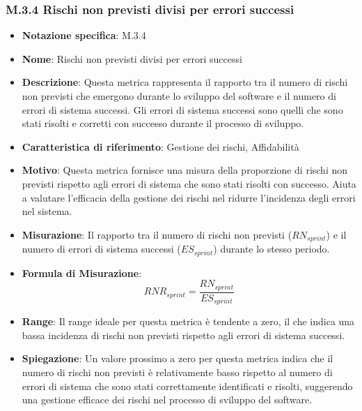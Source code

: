 \subsubsection{M.3.4 Rischi non previsti divisi per errori successi}
\begin{itemize}
    \item \textbf{Notazione specifica}: M.3.4
    \item \textbf{Nome}: Rischi non previsti divisi per errori successi
    \item \textbf{Descrizione}: Questa metrica rappresenta il rapporto tra il numero di rischi non previsti che emergono durante lo sviluppo del software e il numero di errori di sistema successi. Gli errori di sistema successi sono quelli che sono stati risolti e corretti con successo durante il processo di sviluppo.
    \item \textbf{Caratteristica di riferimento}: Gestione dei rischi, Affidabilità
    \item \textbf{Motivo}: Questa metrica fornisce una misura della proporzione di rischi non previsti rispetto agli errori di sistema che sono stati risolti con successo. Aiuta a valutare l'efficacia della gestione dei rischi nel ridurre l'incidenza degli errori nel sistema.
    \item \textbf{Misurazione}: Il rapporto tra il numero di rischi non previsti (\( RN_{sprint} \)) e il numero di errori di sistema successi (\( ES_{sprint} \)) durante lo stesso periodo.
    \item \textbf{Formula di Misurazione}:
    \[
    RNR_{sprint} = \frac{RN_{sprint}}{ES_{sprint}}
    \]
    \item \textbf{Range}: Il range ideale per questa metrica è tendente a zero, il che indica una bassa incidenza di rischi non previsti rispetto agli errori di sistema successi.
    \item \textbf{Spiegazione}: Un valore prossimo a zero per questa metrica indica che il numero di rischi non previsti è relativamente basso rispetto al numero di errori di sistema che sono stati correttamente identificati e risolti, suggerendo una gestione efficace dei rischi nel processo di sviluppo del software.
\end{itemize}
